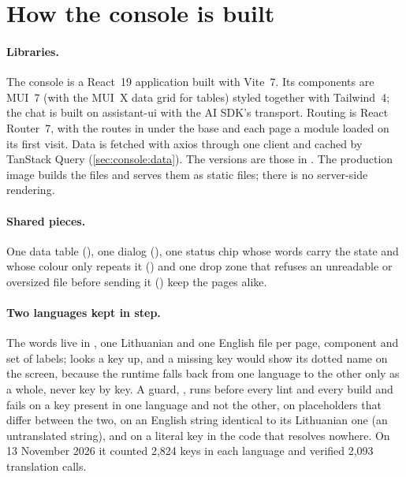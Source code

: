 \section{How the console is built}\label{sec:console:built}

\paragraph{Libraries.} The console is a React~19 application built with Vite~7. Its components are
MUI~7 (with the MUI~X data grid for tables) styled together with Tailwind~4; the chat is built on
assistant-ui with the AI SDK's transport. Routing is React Router~7, with the routes in
 under the base  and each page a module loaded on its first visit.
Data is fetched with axios through one client and cached by TanStack Query (\cref{sec:console:data}).
The versions are those in . The production image builds the files and
serves them as static files; there is no server-side rendering.

\paragraph{Shared pieces.} One data table (), one
dialog (), one status chip whose words carry
the state and whose colour only repeats it () and one
drop zone that refuses an unreadable or oversized file before sending it
() keep the pages alike.

\paragraph{Two languages kept in step.} The words live in , one Lithuanian and one
English file per page, component and set of labels;  looks a key up, and a missing
key would show its dotted name on the screen, because the runtime falls back from one language to
the other only as a whole, never key by key. A guard, ,
runs before every lint and every build and fails on a key present in one language and not the
other, on placeholders that differ between the two, on an English string identical to its
Lithuanian one (an untranslated string), and on a literal key in the code that resolves nowhere.
On 13 November 2026 it counted 2,824 keys in each language and verified 2,093 translation calls.

